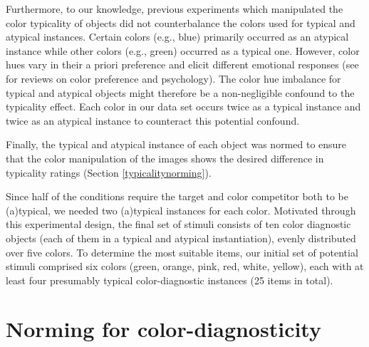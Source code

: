 \documentclass[a4paper,man,floatsintext,natbib,donotrepeattitle]{apa6}
\begin{document}
Furthermore, to our knowledge, previous experiments which manipulated the color typicality of objects did not counterbalance the colors used for typical and atypical instances. Certain colors (e.g., blue) primarily occurred as an atypical instance while other colors (e.g., green) occurred as a typical one. However, color hues vary in their a priori preference and elicit different emotional responses (see \cite{Palmer:2013, Elliot:2014} for reviews on color preference and psychology). The color hue imbalance for typical and atypical objects might therefore be a non-negligible confound to the typicality effect. Each color in our data set occurs twice as a typical instance and twice as an atypical instance to counteract this potential confound.

Finally, the typical and atypical instance of each object was normed to ensure that the color manipulation of the images shows the desired difference in typicality ratings (Section \ref{typicalitynorming}).

Since half of the conditions require the target and color competitor both to be (a)typical, we needed two (a)typical instances for each color. Motivated through this experimental design, the final set of stimuli consists of ten color diagnostic objects (each of them in a typical and atypical instantiation), evenly distributed over five colors. To determine the most suitable items, our initial set of potential stimuli comprised six colors (green, orange, pink, red, white, yellow), each with at least four presumably typical color-diagnostic instances (25 items in total).

\section{Norming for color-diagnosticity}
\label{coldiagnorming}




\end{document}

